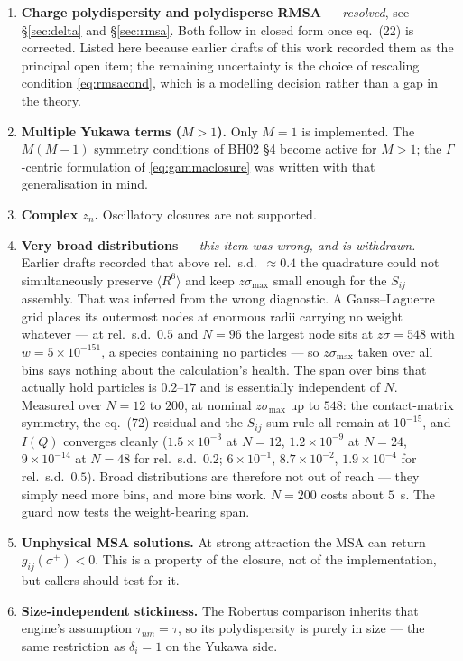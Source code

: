 \documentclass[11pt,a4paper]{article}
\newcommand{\eqBH}[1]{eq.~(#1)}
\begin{document}
\begin{enumerate}\itemsep2pt
\item \textbf{Charge polydispersity and polydisperse RMSA} ---
  \emph{resolved}, see \S\ref{sec:delta} and \S\ref{sec:rmsa}. Both follow in
  closed form once \eqBH{22} is corrected. Listed here because earlier drafts
  of this work recorded them as the principal open item; the remaining
  uncertainty is the choice of rescaling condition
  \eqref{eq:rmsacond}, which is a modelling decision rather than a gap in the
  theory.
\item \textbf{Multiple Yukawa terms ($M>1$).} Only $M=1$ is implemented. The
  $M(M-1)$ symmetry conditions of BH02 \S4 become active for $M>1$; the
  $\Gamma$-centric formulation of \eqref{eq:gammaclosure} was written with that
  generalisation in mind.
\item \textbf{Complex $z_n$.} Oscillatory closures are not supported.
\item \textbf{Very broad distributions} --- \emph{this item was wrong, and is
  withdrawn.} Earlier drafts recorded that above rel.\ s.d.\ $\approx0.4$ the
  quadrature could not simultaneously preserve $\langle R^6\rangle$ and keep
  $z\sigma_{\max}$ small enough for the $S_{ij}$ assembly. That was inferred
  from the wrong diagnostic. A Gauss--Laguerre grid places its outermost nodes
  at enormous radii carrying no weight whatever --- at rel.\ s.d.\ $0.5$ and
  $N=96$ the largest node sits at $z\sigma=548$ with $w=5\times10^{-151}$, a
  species containing no particles --- so $z\sigma_{\max}$ taken over all bins
  says nothing about the calculation's health. The span over bins that
  actually hold particles is $0.2$--$17$ and is essentially independent of
  $N$. Measured over $N=12$ to $200$, at nominal $z\sigma_{\max}$ up to $548$:
  the contact-matrix symmetry, the \eqBH{72} residual and the $S_{ij}$ sum
  rule all remain at $10^{-15}$, and $I(Q)$ converges cleanly
  ($1.5\times10^{-3}$ at $N=12$, $1.2\times10^{-9}$ at $N=24$,
  $9\times10^{-14}$ at $N=48$ for rel.\ s.d.\ $0.2$; $6\times10^{-1}$,
  $8.7\times10^{-2}$, $1.9\times10^{-4}$ for rel.\ s.d.\ $0.5$). Broad
  distributions are therefore not out of reach --- they simply need more bins,
  and more bins work. $N=200$ costs about $5$~s. The guard now tests the
  weight-bearing span.
\item \textbf{Unphysical MSA solutions.} At strong attraction the MSA can
  return $g_{ij}(\sigma^+)<0$. This is a property of the closure, not of the
  implementation, but callers should test for it.
\item \textbf{Size-independent stickiness.} The Robertus comparison inherits
  that engine's assumption $\tau_{nm}=\tau$, so its polydispersity is purely in
  size --- the same restriction as $\delta_i=1$ on the Yukawa side.
\end{enumerate}
\end{document}
